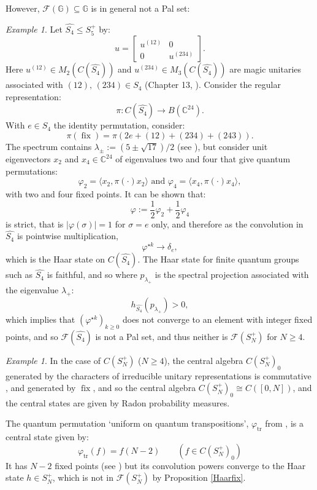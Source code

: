 \documentclass[12pt]{amsart}
\theoremstyle{remark}
\newtheorem{example}[theorem]{Example}
\theoremstyle{remark}
\begin{document}
However, $\mathcal{F}(\mathbb{G})\subseteq \mathbb{G}$ is in general not a Pal set:
\begin{example}
Let $\widehat{S_4}\leq S_5^+$ by:
$$u=\begin{bmatrix}
      u^{(12)} & 0 \\
      0 & u^{(234)}
    \end{bmatrix}.$$
Here $u^{(12)}\in M_2(C(\widehat{S_4}))$ and $u^{(234)}\in M_3(C(\widehat{S_4}))$ are magic unitaries associated with $(12),\,(234)\in S_4$ (Chapter 13, \cite{ba1}). Consider the regular representation:
$$\pi: C(\widehat{S_4})\to B(\mathbb{C}^{24}).$$
With $e\in S_4$ the identity permutation, consider:
$$\pi(\operatorname{fix})=\pi(2e+(12)+(234)+(243)).$$
The spectrum contains $\lambda_{\pm}:=(5\pm\sqrt{17})/2$ (see \cite{mcc}), but consider unit eigenvectors $x_2$ and $x_4\in\mathbb{C}^{24}$ of eigenvalues two and four that give quantum permutations:
 $$\varphi_2=\langle x_2,\pi(\cdot )x_2\rangle\text{ and }\varphi_4=\langle x_4,\pi(\cdot )x_4\rangle,$$
 with two and four fixed points. It can be shown that:
$$\varphi:=\frac12\varphi_2+\frac12\varphi_4$$
is strict, that is $|\varphi(\sigma)|=1$ for $\sigma=e$ only, and therefore as the convolution in $\widehat{S_4}$ is pointwise multiplication,
$$\varphi^{\star k}\to\delta_e,$$
which is the Haar state on $C(\widehat{S_4})$. The Haar state for finite quantum groups such as $\widehat{S_4}$ is faithful, and so where $p_{\lambda_+}$ is the spectral projection associated with the eigenvalue $\lambda_+$:
$$h_{\widehat{S_4}}(p_{\lambda_+})>0,$$
which implies that $(\varphi^{\star k})_{k\geq 0}$ does not converge to an element with integer fixed points, and so  $\mathcal{F}(\widehat{S_4})$ is not a Pal set, and thus neither is $\mathcal{F}(S_N^+)$ for $N\geq 4$.
\end{example}
\begin{example}
In the case of $C(S_N^+)$ ($N\geq 4$), the central algebra $C(S_N^+)_0$ generated by the characters of irreducible unitary representations is commutative \cite{fre}, and generated by $\operatorname{fix}$, and so the central algebra $C(S_N^+)_0\cong C([0,N])$, and the central states are given by Radon probability measures.

\bigskip

The quantum permutation `uniform on quantum transpositions', $\varphi_{\text{tr}}$ from \cite{fre}, is a central state given by:
$$\varphi_{\text{tr}}(f)=f(N-2)\qquad(f\in C(S_N^+)_0)$$
 It has $N-2$ fixed points (see \cite{mcc}) but its convolution powers converge to the Haar state $h\in S_N^+$, which is not in $\mathcal{F}(S_N^+)$ by Proposition \ref{Haarfix}.
\end{example}
\end{document}
